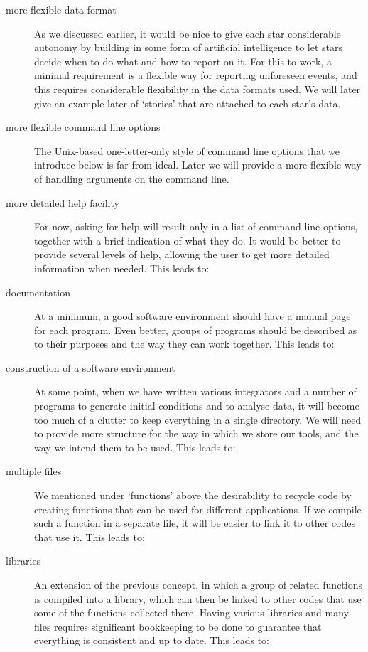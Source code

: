\begin{description}
\item[more flexible data format]
As we discussed earlier, it would be nice to give each star
considerable autonomy by building in some form of artificial
intelligence to let stars decide when to do what and how to
report on it.  For this to work, a minimal requirement is a
flexible way for reporting unforeseen events, and this requires
considerable flexibility in the data formats used.  We will
later give an example later of `stories' that are attached to
each star's data.

\item[more flexible command line options]
The Unix-based one-letter-only style of command line options that we
introduce below is far from ideal.  Later we will provide a more
flexible way of handling arguments on the command line.

\item[more detailed help facility]
For now, asking for help will result only in a list of command line
options, together with a brief indication of what they do.  It would
be better to provide several levels of help, allowing the user to get
more detailed information when needed.  This leads to:

\item[documentation]
At a minimum, a good software environment should have a manual page
for each program.  Even better, groups of programs should be described
as to their purposes and the way they can work together.  This leads to:

\item[construction of a software environment]
At some point, when we have written various integrators and a number
of programs to generate initial conditions and to analyse data, it
will become too much of a clutter to keep everything in a single
directory.  We will need to provide more structure for the way in
which we store our tools, and the way we intend them to be used.  This
leads to:

\item[multiple files]
We mentioned under `functions' above the desirability to recycle code
by creating functions that can be used for different applications.  If
we compile such a function in a separate file, it will be easier to
link it to other codes that use it.  This leads to:

\item[libraries]
An extension of the previous concept, in which a group of related
functions is compiled into a library, which can then be linked to
other codes that use some of the functions collected there.  Having
various libraries and many files requires significant bookkeeping to
be done to guarantee that everything is consistent and up to date.
This leads to:


\end{description}
